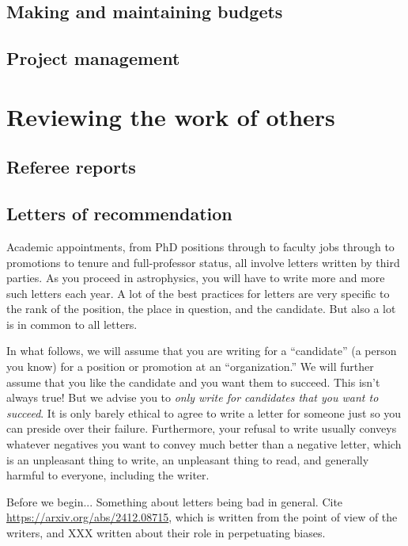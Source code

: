 \documentclass[letterpaper]{book}
\begin{document}
\chapter{Making and maintaining budgets}

\chapter{Project management}

\part{Reviewing the work of others}

\chapter{Referee reports}
\setcounter{page}{351}

\chapter{Letters of recommendation}

Academic appointments, from PhD positions through to faculty jobs through to promotions to tenure and full-professor status, all involve letters written by third parties.
As you proceed in astrophysics, you will have to write more and more such letters each year.
A lot of the best practices for letters are very specific to the rank of the position, the place in question, and the candidate.
But also a lot is in common to all letters.

In what follows, we will assume that you are writing for a ``candidate'' (a person you know) for a position or promotion at an ``organization.''
We will further assume that you like the candidate and you want them to succeed.
This isn't always true!
But we advise you to \emph{only write for candidates that you want to succeed}.
It is only barely ethical to agree to write a letter for someone just so you can preside over their failure.
Furthermore, your refusal to write usually conveys whatever negatives you want to convey much better than a negative letter, which is an unpleasant thing to write, an unpleasant thing to read, and generally harmful to everyone, including the writer.

Before we begin... Something about letters being bad in general. Cite \url{https://arxiv.org/abs/2412.08715}, which is written from the point of view of the writers, and XXX written about their role in perpetuating biases.
\end{document}
